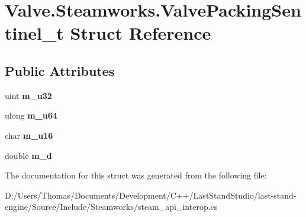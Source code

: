 \hypertarget{structValve_1_1Steamworks_1_1ValvePackingSentinel__t}{}\section{Valve.\+Steamworks.\+Valve\+Packing\+Sentinel\+\_\+t Struct Reference}
\label{structValve_1_1Steamworks_1_1ValvePackingSentinel__t}
\subsection*{Public Attributes}
\begin{DoxyCompactItemize}
\item 
\hypertarget{structValve_1_1Steamworks_1_1ValvePackingSentinel__t_aae484ccf066d91599f01acdac3204a51}{}uint {\bfseries m\+\_\+u32}\label{structValve_1_1Steamworks_1_1ValvePackingSentinel__t_aae484ccf066d91599f01acdac3204a51}

\item 
\hypertarget{structValve_1_1Steamworks_1_1ValvePackingSentinel__t_ae32aea2b10ddf82e2e1e364ff433a0c1}{}ulong {\bfseries m\+\_\+u64}\label{structValve_1_1Steamworks_1_1ValvePackingSentinel__t_ae32aea2b10ddf82e2e1e364ff433a0c1}

\item 
\hypertarget{structValve_1_1Steamworks_1_1ValvePackingSentinel__t_af75626ac4e1cf1c7dbd67025582484dd}{}char {\bfseries m\+\_\+u16}\label{structValve_1_1Steamworks_1_1ValvePackingSentinel__t_af75626ac4e1cf1c7dbd67025582484dd}

\item 
\hypertarget{structValve_1_1Steamworks_1_1ValvePackingSentinel__t_a05c36602c56a21c3b48c8f98efaf4685}{}double {\bfseries m\+\_\+d}\label{structValve_1_1Steamworks_1_1ValvePackingSentinel__t_a05c36602c56a21c3b48c8f98efaf4685}

\end{DoxyCompactItemize}


The documentation for this struct was generated from the following file\+:\begin{DoxyCompactItemize}
\item 
D\+:/\+Users/\+Thomas/\+Documents/\+Development/\+C++/\+Last\+Stand\+Studio/last-\/stand-\/engine/\+Source/\+Include/\+Steamworks/steam\+\_\+api\+\_\+interop.\+cs\end{DoxyCompactItemize}
